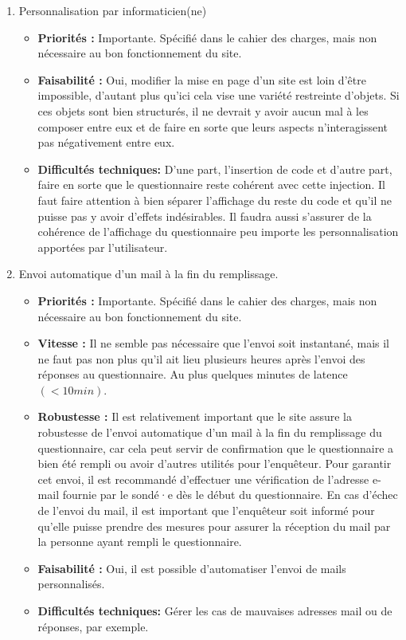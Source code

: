 \documentclass{article}
\begin{document}
\begin{enumerate}[noitemsep]
\item Personnalisation par informaticien(ne)
\begin{itemize}[noitemsep]
\item \textbf{Priorités : }Importante. Spécifié dans le cahier des charges, mais non nécessaire au bon fonctionnement du site.
\item \textbf{Faisabilité : }Oui, modifier la mise en page d'un site est loin d'être impossible, d'autant plus qu'ici cela vise une variété restreinte d'objets. Si ces objets sont bien structurés, il ne devrait y avoir aucun mal à les composer entre eux et de faire en sorte que leurs aspects n'interagissent pas négativement entre eux.
\item \textbf{Difficultés techniques: } D'une part, l'insertion de code et d'autre part, faire en sorte que le questionnaire reste cohérent avec cette injection. Il faut faire attention à bien séparer l'affichage du reste du code et qu'il ne puisse pas y avoir d'effets indésirables. Il faudra aussi s'assurer de la cohérence de l'affichage du questionnaire peu importe les personnalisation apportées par l'utilisateur.
\end{itemize}


\item Envoi automatique d'un mail à la fin du remplissage.
\begin{itemize}[noitemsep]
    \item \textbf{Priorités : }Importante. Spécifié dans le cahier des charges, mais non nécessaire au bon fonctionnement du site.
    \item \textbf{Vitesse : }Il ne semble pas nécessaire que l'envoi soit instantané, mais il ne faut pas non plus qu'il ait lieu plusieurs heures après l'envoi des réponses au questionnaire. Au plus quelques minutes de latence $(<10min)$.
    \item \textbf{Robustesse : }Il est relativement important que le site assure la robustesse de l'envoi automatique d'un mail à la fin du remplissage du questionnaire, car cela peut servir de confirmation que le questionnaire a bien été rempli ou avoir d'autres utilités pour l'enquêteur. Pour garantir cet envoi, il est recommandé d'effectuer une vérification de l'adresse e-mail fournie par le sondé·e dès le début du questionnaire. En cas d'échec de l'envoi du mail, il est important que l'enquêteur soit informé pour qu'elle puisse prendre des mesures pour assurer la réception du mail par la personne ayant rempli le questionnaire.
    \item \textbf{Faisabilité : }Oui, il est possible d'automatiser l'envoi de mails personnalisés.
    \item \textbf{Difficultés techniques: } Gérer les cas de mauvaises adresses mail ou de réponses, par exemple.
\end{itemize}

\end{enumerate}
\end{document}
